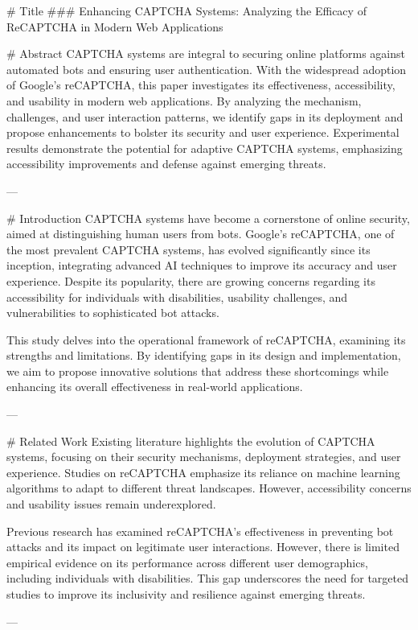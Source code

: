 # Title
### Enhancing CAPTCHA Systems: Analyzing the Efficacy of ReCAPTCHA in Modern Web Applications

# Abstract
CAPTCHA systems are integral to securing online platforms against automated bots and ensuring user authentication. With the widespread adoption of Google's reCAPTCHA, this paper investigates its effectiveness, accessibility, and usability in modern web applications. By analyzing the mechanism, challenges, and user interaction patterns, we identify gaps in its deployment and propose enhancements to bolster its security and user experience. Experimental results demonstrate the potential for adaptive CAPTCHA systems, emphasizing accessibility improvements and defense against emerging threats.

---

# Introduction
CAPTCHA systems have become a cornerstone of online security, aimed at distinguishing human users from bots. Google's reCAPTCHA, one of the most prevalent CAPTCHA systems, has evolved significantly since its inception, integrating advanced AI techniques to improve its accuracy and user experience. Despite its popularity, there are growing concerns regarding its accessibility for individuals with disabilities, usability challenges, and vulnerabilities to sophisticated bot attacks.

This study delves into the operational framework of reCAPTCHA, examining its strengths and limitations. By identifying gaps in its design and implementation, we aim to propose innovative solutions that address these shortcomings while enhancing its overall effectiveness in real-world applications.

---

# Related Work
Existing literature highlights the evolution of CAPTCHA systems, focusing on their security mechanisms, deployment strategies, and user experience. Studies on reCAPTCHA emphasize its reliance on machine learning algorithms to adapt to different threat landscapes. However, accessibility concerns and usability issues remain underexplored.

Previous research has examined reCAPTCHA's effectiveness in preventing bot attacks and its impact on legitimate user interactions. However, there is limited empirical evidence on its performance across different user demographics, including individuals with disabilities. This gap underscores the need for targeted studies to improve its inclusivity and resilience against emerging threats.

---

